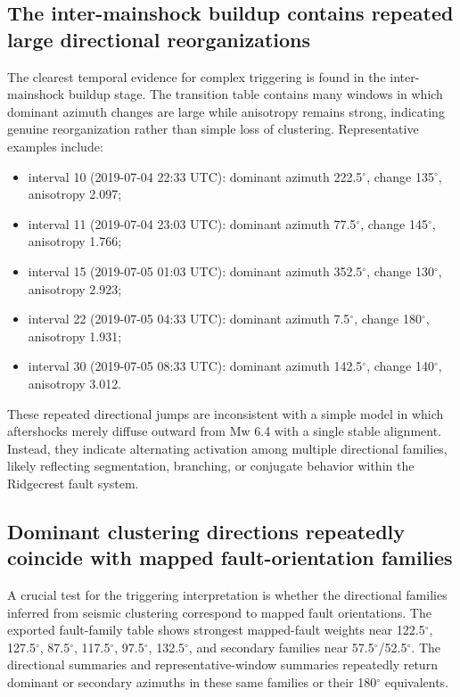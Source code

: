 \documentclass[11pt]{article}
\begin{document}
\subsection{The inter-mainshock buildup contains repeated large directional reorganizations}
The clearest temporal evidence for complex triggering is found in the inter-mainshock buildup stage. The transition table contains many windows in which dominant azimuth changes are large while anisotropy remains strong, indicating genuine reorganization rather than simple loss of clustering. Representative examples include:
\begin{itemize}[leftmargin=2em]
    \item interval 10 (2019-07-04 22:33 UTC): dominant azimuth 222.5$^{\circ}$, change 135$^{\circ}$, anisotropy 2.097;
    \item interval 11 (2019-07-04 23:03 UTC): dominant azimuth 77.5$^{\circ}$, change 145$^{\circ}$, anisotropy 1.766;
    \item interval 15 (2019-07-05 01:03 UTC): dominant azimuth 352.5$^{\circ}$, change 130$^{\circ}$, anisotropy 2.923;
    \item interval 22 (2019-07-05 04:33 UTC): dominant azimuth 7.5$^{\circ}$, change 180$^{\circ}$, anisotropy 1.931;
    \item interval 30 (2019-07-05 08:33 UTC): dominant azimuth 142.5$^{\circ}$, change 140$^{\circ}$, anisotropy 3.012.
\end{itemize}

These repeated directional jumps are inconsistent with a simple model in which aftershocks merely diffuse outward from Mw 6.4 with a single stable alignment. Instead, they indicate alternating activation among multiple directional families, likely reflecting segmentation, branching, or conjugate behavior within the Ridgecrest fault system.

\subsection{Dominant clustering directions repeatedly coincide with mapped fault-orientation families}
A crucial test for the triggering interpretation is whether the directional families inferred from seismic clustering correspond to mapped fault orientations. The exported fault-family table shows strongest mapped-fault weights near 122.5$^{\circ}$, 127.5$^{\circ}$, 87.5$^{\circ}$, 117.5$^{\circ}$, 97.5$^{\circ}$, 132.5$^{\circ}$, and secondary families near 57.5$^{\circ}$/52.5$^{\circ}$. The directional summaries and representative-window summaries repeatedly return dominant or secondary azimuths in these same families or their 180$^{\circ}$ equivalents.
\end{document}
